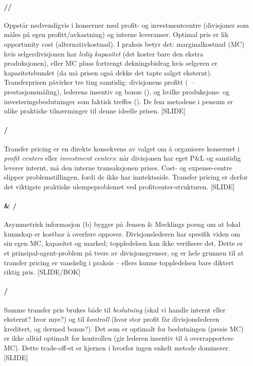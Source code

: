 \paragraph{\quad\SOne/\STwo/\SThree}
Oppstår nødvendigvis i konserner med profit- og investmentcentre (divisjoner som måles på egen profitt/avkastning) og interne leveranser. Optimal pris er lik opportunity cost (alternativkostnad). I praksis betyr det: marginalkostnad (MC) hvis selgerdivisjonen har \emph{ledig kapasitet} (det koster bare den ekstra produksjonen), eller MC pluss fortrengt dekningsbidrag hvis selgeren er kapasitetsbundet (da må prisen også dekke det tapte salget eksternt). Transferprisen påvirker tre ting samtidig: divisjonens profitt (\STwo\ -- prestasjonsmåling), lederens insentiv og bonus (\SThree), og hvilke produksjons- og investeringsbeslutninger som faktisk treffes (\SOne). De fem metodene i pensum er ulike praktiske tilnærminger til denne ideelle prisen. [SLIDE]

\paragraph{\quad\SOne/\STwo}
Transfer pricing er en direkte konsekvens av valget om å organisere konsernet i \emph{profit centers} eller \emph{investment centers}: når divisjonen har eget P\&L og samtidig leverer internt, må den interne transaksjonen prises. Cost- og expense-centre slipper problemstillingen, fordi de ikke har inntektsside. Transfer pricing er derfor det viktigste praktiske ulempeproblemet ved profitcenter-strukturen. [SLIDE]

\paragraph{ \& \quad\SOne/\SThree}
Asymmetrisk informasjon (b) bygger på Jensen \& Mecklings poeng om at lokal kunnskap er kostbar å overføre oppover. Divisjonslederen har spesifik viden om sin egen MC, kapasitet og marked; toppledelsen kan ikke verifisere det. Dette er et prinsipal-agent-problem på tvers av divisjonsgrenser, og er hele grunnen til at transfer pricing er vanskelig i praksis -- ellers kunne toppledelsen bare diktert riktig pris. [SLIDE/BOK]

\paragraph{\quad\STwo/\SThree}
Samme transfer pris brukes både til \emph{beslutning} (skal vi handle internt eller eksternt? hvor mye?) og til \emph{kontroll} (hvor stor profit får divisjonslederen kreditert, og dermed bonus?). Det som er optimalt for beslutningen (presis MC) er ikke alltid optimalt for kontrollen (gir lederen insentiv til å overrapportere MC). Dette trade-off-et er kjernen i hvorfor ingen enkelt metode dominerer. [SLIDE]

